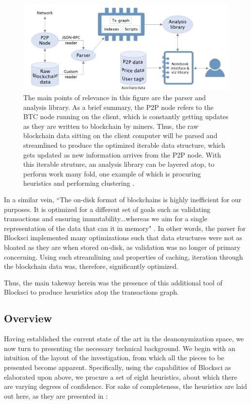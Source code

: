 \documentclass{article}
\begin{document}
\begin{figure}
    \label{fig:blocksci}
    \centering
    \includegraphics[width=.75\textwidth]{blocksci.png}
    \caption[Blocksci Architecture]{The main points of relevance in this figure are the parser and analysis library. As a brief summary, the P2P node refers to the BTC node running on the client, which is constantly getting updates as they are written to blockchain by miners. Thus, the raw blockchain data sitting on the client computer will be parsed and streamlined to produce the optimized iterable data structure, which gets updated as new information arrives from the P2P node. With this iterable struture, an analysis library can be layered atop, to perform work many fold, one example of which is procuring heuristics and performing clustering \cite{blocksci}.}
\end{figure}

In a similar vein, ``The on-disk format of blockchains is highly inefficient for our purposes. It is optimized for a different set of goals such as validating transactions and ensuring immutability...whereas we aim for a single representation of the data that can it in memory" \cite{blocksci}. In other words, the parser for Blocksci implemented many optimizations such that data structures were not as bloated as they are when stored on-disk, as validation was no longer of primary concerning. Using such streamlining and properties of caching, iteration through the blockchain data was, therefore, significantly optimized.

Thus, the main takeway herein was the presence of this additional tool of Blocksci to produce heuristics atop the transactions graph.

\subsection{Overview}
Having established the current state of the art in the deanonymization space, we now turn to presenting the necessary technical background. We begin with an intuition of the layout of the investigation, from which all the pieces to be presented become apparent. Specifically, using the capabilities of Blocksci as elaborated upon above, we procure a set of eight heuristics, about which there are varying degrees of confidence. For sake of completeness, the heuristics are laid out here, as they are presented in \cite{heuristics}:
\end{document}
